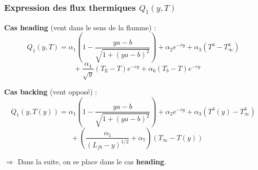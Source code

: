 \documentclass[handout]{beamer}
\newtheorem{pbm et hypo}[thm]{Problématique et hypothèses}
\begin{document}
	\begin{frame}
		\frametitle{Expression des flux thermiques $Q_1(y,T)$}
		
		\begin{itemize}
			\item \textbf{Cas heading} (vent dans le sens de la flamme) :
			\begin{equation*}
				Q_1(y,T) = \alpha_1 \left(1 - \frac{ya - b}{\sqrt{1 + (ya - b)^2}} \right)
				+ \alpha_2 e^{-ry} + \alpha_3 (T^4 - T_\infty^4)
			\end{equation*}
			\vspace{-1em}
			\begin{equation*}
				\quad + \frac{\alpha_4}{\sqrt{y}} (T_{\text{fl}} - T) e^{-cy}
				+ \alpha_6 (T_b - T) e^{-ry}
			\end{equation*}
			
			\item \textbf{Cas backing} (vent opposé) :
			\begin{equation*}
				Q_1(y,T(y)) = \alpha_1 \left(1-\frac{ya-b}{\sqrt{1+(ya-b)^2}}\right) + \alpha_2e^{-ry}
				+ \alpha_3\left(T^4(y) - T_\infty^4\right)
			\end{equation*}
			\vspace{-1em}
			\begin{equation*}
				\quad + \left(\frac{\alpha_5}{(L_{fb}-y)^{1/2}}+ \alpha_7\right) 
				\left(T_\infty - T(y)\right)
			\end{equation*}
			
			\begin{center}
				\item[$\Rightarrow$] Dans la suite, on se place dans le cas \textbf{heading}.
			\end{center}
		\end{itemize}
	\end{frame}
	
	
\end{document}
